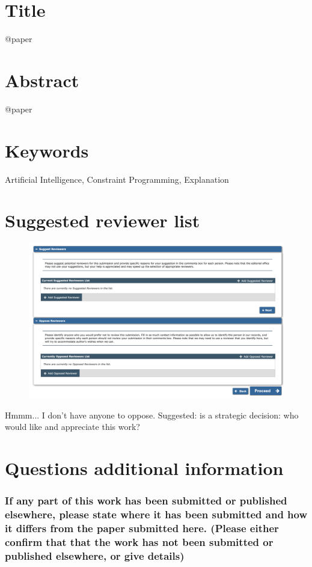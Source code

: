 \documentclass{article}
\begin{document}
\section*{Title}
@paper
\section*{Abstract}
@paper
\section*{Keywords}
Artificial Intelligence, Constraint Programming, Explanation

\section*{Suggested reviewer list}
\begin{figure}[h!]
    \centering
    \includegraphics[width=\textwidth]{reviewers}
\end{figure}

Hmmm... I don't have anyone to oppose. 
Suggested: is a strategic decision: who would like and appreciate this work? 

\section*{Questions additional information}
\subsubsection*{If any part of this work has been submitted or published elsewhere, please state where it has been submitted and how it differs from the paper submitted here. (Please either confirm that that the work has not been submitted or published elsewhere, or give details)}
\end{document}
